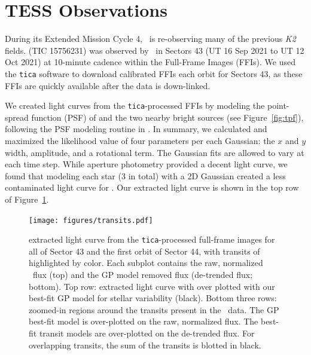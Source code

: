 \documentclass[twocolumn]{aastex631}
\begin{document}
\section{TESS Observations} \label{sec:observations}

During its Extended Mission Cycle 4, \tess\ is re-observing many of the previous \textit{K2} fields. \sname (TIC 15756231) was observed by \tess\ in Sectors 43 (UT 16 Sep 2021 to UT 12 Oct 2021) at 10-minute cadence within the Full-Frame Images (FFIs). We used the \texttt{tica} \citep{fausnaugh20} software to download calibrated FFIs each orbit for Sectors 43, as these FFIs are quickly available after the data is down-linked. 

We created light curves from the \texttt{tica}-processed FFIs by modeling the point-spread function (PSF) of \sname and the two nearby bright sources (see Figure~\ref{fig:tpf}), following the PSF modeling routine in \cite{feinstein19}. In summary, we calculated and maximized the likelihood value of four parameters per each Gaussian: the $x$ and $y$ width, amplitude, and a rotational term. The Gaussian fits are allowed to vary at each time step. While aperture photometry provided a decent light curve, we found that modeling each star (3 in total) with a 2D Gaussian created a less contaminated light curve for \sname. Our extracted light curve is shown in the top row of Figure~\ref{fig:transits}.

\begin{figure}[hbtp]
\begin{center}
\texttt{[image: figures/transits.pdf]}
\caption{\sname extracted light curve from the \texttt{tica}-processed full-frame images for all of Sector 43 and the first orbit of Sector 44, with transits of \allplanets highlighted by color. Each subplot contains the raw, normalized \tess\ flux (top) and the GP model removed flux (de-trended flux; bottom). Top row: extracted light curve with over plotted with our best-fit GP model for stellar variability (black). Bottom three rows: zoomed-in regions around the transits present in the \tess\ data. The GP best-fit model is over-plotted on the raw, normalized flux. The best-fit transit models are over-plotted on the de-trended flux. For overlapping transits, the sum of the transits is blotted in black.} \label{fig:transits}
\end{center}
\end{figure}
\end{document}
